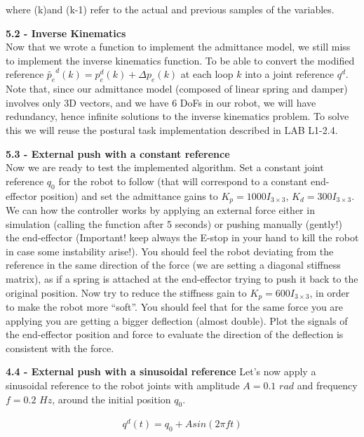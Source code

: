 \documentclass[11pt]{article}
\begin{document}
where (k)and (k-1) refer to the actual and previous samples of the variables. 


\quad

\noindent
\textbf{5.2 - Inverse Kinematics}\\
Now that we wrote a function to implement the admittance model, we still miss to implement the inverse kinematics function. To be able to convert the modified reference $\tilde{p_e}^d(k) = p_e^d(k) +  \Delta p_e(k)$  at each loop $k$ into a joint reference $q^d$. Note that, since our admittance model (composed of linear spring and damper)  involves only 3D vectors, and we have 6 DoFs in our robot, we will have redundancy, hence  infinite solutions to the inverse kinematics problem. To solve this we will reuse the postural task implementation described in LAB L1-2.4.


\quad

\noindent
\textbf{5.3 - External push with a constant reference}\\
Now we are ready to test the implemented algorithm. Set  a constant joint reference $q_0$  for the robot to follow (that will correspond to a constant end-effector position) and set the admittance gains to $K_p = 1000I_{3\times3}$,  $K_d = 300I_{3\times3}$. We can how the controller works by applying an external force either in simulation (calling the function  after 5 seconds) or pushing manually (gently!) the end-effector (Important! keep always the E-stop in your hand to kill the robot in case some instability arise!). You should feel the robot deviating from the reference in the same direction of the force (we are setting a diagonal stiffness matrix), as if a spring is attached at the end-effector trying to push it back to the original position. 
Now try to reduce the stiffness gain to $K_p = 600I_{3\times3}$, in order to make the robot more ``soft''. You should feel that for the same force you are applying you are getting a bigger deflection (almost double).
Plot the signals of the end-effector position and force to evaluate the direction of the deflection is consistent with the force.

\textbf{4.4 - External push with a sinusoidal reference}
Let's now apply a sinusoidal reference to the robot joints  with amplitude $A= 0.1$ $rad$ and frequency $f = 0.2$ $Hz$, around the initial position $q_0$.

\begin{align*}
q^d(t) = q_0 + Asin(2\pi f t )
\end{align*} 
\end{document}

